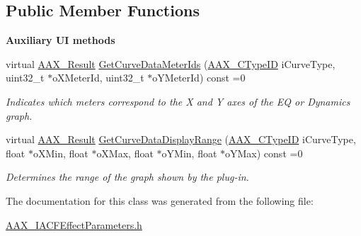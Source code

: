 \subsection*{Public Member Functions}
\begin{Indent}\textbf{ Auxiliary UI methods}\par
\begin{DoxyCompactItemize}
\item 
virtual \mbox{\hyperlink{a00392_a4d8f69a697df7f70c3a8e9b8ee130d2f}{A\+A\+X\+\_\+\+Result}} \mbox{\hyperlink{a00812_gac7ba3c1063c35d761fdeba9c9a6cc0d1}{Get\+Curve\+Data\+Meter\+Ids}} (\mbox{\hyperlink{a00392_ac678f9c1fbcc26315d209f71a147a175}{A\+A\+X\+\_\+\+C\+Type\+ID}} i\+Curve\+Type, uint32\+\_\+t $\ast$o\+X\+Meter\+Id, uint32\+\_\+t $\ast$o\+Y\+Meter\+Id) const =0
\begin{DoxyCompactList}\small\item\em Indicates which meters correspond to the X and Y axes of the EQ or Dynamics graph. \end{DoxyCompactList}\item 
virtual \mbox{\hyperlink{a00392_a4d8f69a697df7f70c3a8e9b8ee130d2f}{A\+A\+X\+\_\+\+Result}} \mbox{\hyperlink{a00812_ga38d1ac0c15a7052904077ef0e2527e0d}{Get\+Curve\+Data\+Display\+Range}} (\mbox{\hyperlink{a00392_ac678f9c1fbcc26315d209f71a147a175}{A\+A\+X\+\_\+\+C\+Type\+ID}} i\+Curve\+Type, float $\ast$o\+X\+Min, float $\ast$o\+X\+Max, float $\ast$o\+Y\+Min, float $\ast$o\+Y\+Max) const =0
\begin{DoxyCompactList}\small\item\em Determines the range of the graph shown by the plug-\/in. \end{DoxyCompactList}\end{DoxyCompactItemize}
\end{Indent}


The documentation for this class was generated from the following file\+:\begin{DoxyCompactItemize}
\item 
\mbox{\hyperlink{a00530}{A\+A\+X\+\_\+\+I\+A\+C\+F\+Effect\+Parameters.\+h}}\end{DoxyCompactItemize}
